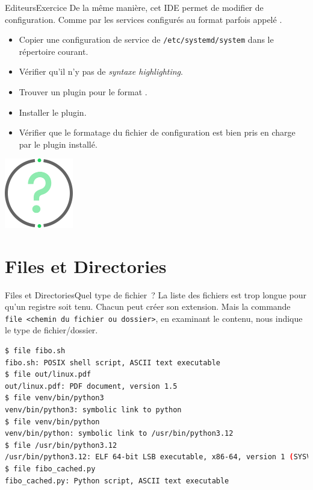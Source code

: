 \documentclass{beamer}
\begin{document}
    \begin{frame}{Editeurs}{Exercice \execcounterdispinc}
        De la même manière, cet IDE permet de modifier de configuration.
        Comme par les services configurés au format parfois appelé .
        \begin{itemize}
            \item Copier une configuration de service de \lstinline{/etc/systemd/system} dans le répertoire courant.
            \item Vérifier qu'il n'y pas de \textit{syntaxe highlighting}.
            \item Trouver un plugin pour le format .
            \item Installer le plugin.
            \item Vérifier que le formatage du fichier de configuration est bien pris en charge par le plugin installé.
        \end{itemize}
        \bigbreak
        \centering
        \includegraphics[width=3cm]{image/question-mark}
    \end{frame}


    \section{Files et Directories}\label{sec:files-directories}

    \begin{frame}[fragile]{Files et Directories}{Quel type de fichier~?}
        La liste des fichiers est trop longue pour qu'un registre soit tenu.
        Chacun peut créer son extension.
        Mais la commande \lstinline{file <chemin du fichier ou dossier>}, en examinant le contenu, nous indique le type de fichier/dossier.
        \begin{lstlisting}[language=bash]
        $ file fibo.sh
fibo.sh: POSIX shell script, ASCII text executable
$ file out/linux.pdf
out/linux.pdf: PDF document, version 1.5
$ file venv/bin/python3
venv/bin/python3: symbolic link to python
$ file venv/bin/python
venv/bin/python: symbolic link to /usr/bin/python3.12
$ file /usr/bin/python3.12
/usr/bin/python3.12: ELF 64-bit LSB executable, x86-64, version 1 (SYSV), dynamically linked, interpreter /lib64/ld-linux-x86-64.so.2, BuildID[sha1]=ccd329aaf9256b96135a9e3f97cbf4c3829377e1, for GNU/Linux 3.2.0, stripped
$ file fibo_cached.py
fibo_cached.py: Python script, ASCII text executable
        \end{lstlisting}
    \end{frame}
\end{document}
